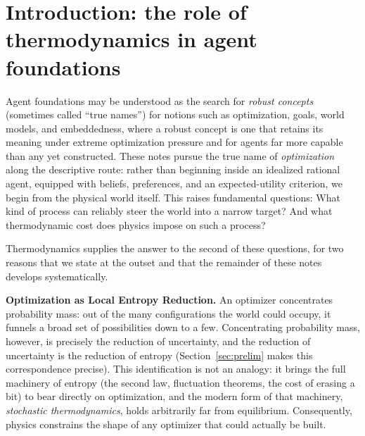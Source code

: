 \documentclass[10pt]{article}
\theoremstyle{definition}
\theoremstyle{remark}
\begin{document}
\begin{abstract}
establish that agents with greater knowledge of the world possess correspondingly greater capacity to act upon it, with the exchange rate between the two set by thermodynamics.
\end{abstract}

\tableofcontents

\section{Introduction: the role of thermodynamics in agent foundations}
\label{sec:intro}

Agent foundations may be understood as the search for \emph{robust concepts} (sometimes called ``true names'') for notions such as optimization, goals, world models, and embeddedness, where a robust concept is one that retains its meaning under extreme optimization pressure and for agents far more capable than any yet constructed. These notes pursue the true name of \emph{optimization} along the descriptive route: rather than beginning inside an idealized rational agent, equipped with beliefs, preferences, and an expected-utility criterion, we begin from the physical world itself. This raises fundamental questions: What kind of process can reliably steer the world into a narrow target? And what thermodynamic cost does physics impose on such a process?

Thermodynamics supplies the answer to the second of these questions, for two reasons that we state at the outset and that the remainder of these notes develops systematically.

\textbf{Optimization as Local Entropy Reduction.} An optimizer concentrates probability mass: out of the many configurations the world could occupy, it funnels a broad set of possibilities down to a few. Concentrating probability mass, however, is precisely the reduction of uncertainty, and the reduction of uncertainty is the reduction of entropy (Section~\ref{sec:prelim} makes this correspondence precise). This identification is not an analogy: it brings the full machinery of entropy (the second law, fluctuation theorems, the cost of erasing a bit) to bear directly on optimization, and the modern form of that machinery, \emph{stochastic thermodynamics}, holds arbitrarily far from equilibrium. Consequently, physics constrains the shape of any optimizer that could actually be built.
\end{document}
